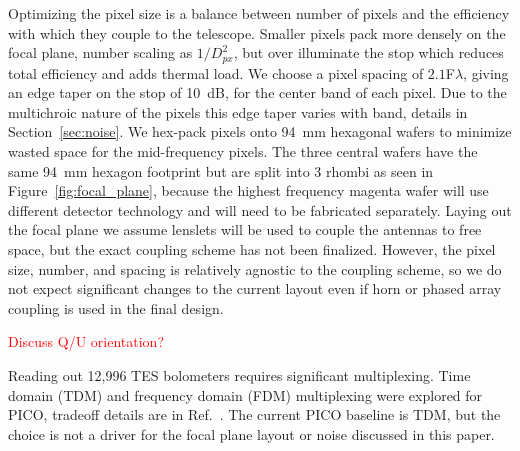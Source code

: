 \documentclass[]{spie}  %
\newcommand{\comr}[1]{\textcolor{red}{#1}}
\newcommand{\dgr}{$^\circ$}
\begin{document}
Optimizing the pixel size is a balance between number of pixels and the efficiency with which they couple to the telescope. Smaller pixels pack more densely 
on the focal plane, number scaling as $1/D_{px}^2$, but over illuminate the stop which reduces total efficiency and adds thermal load.  
We choose a pixel spacing of $2.1$F$\lambda$, giving an edge taper on the stop of 10~dB, for the center 
band of each pixel. Due to the multichroic nature of the pixels this edge taper varies with band, details in Section~\ref{sec:noise}. We hex-pack pixels onto 
94~mm hexagonal wafers to minimize wasted space for the mid-frequency pixels. The three central wafers have the same 94~mm hexagon footprint but are split into 
3 rhombi as seen in Figure~\ref{fig:focal_plane}, because the highest frequency magenta wafer will use different detector technology and will need to be 
fabricated separately.  Laying out the focal plane we assume lenslets \cite{Suzuki2014_samps} will be used to couple the antennas to free space, 
but the exact coupling scheme has not been finalized.  
However, the pixel size, number, and spacing is relatively agnostic to the coupling scheme, so we do not expect significant changes to the 
current layout even if horn or phased array coupling is used in the final design.

\comr{Discuss Q/U orientation?}

Reading out 12,996 TES bolometers requires significant multiplexing.  Time domain (TDM) and frequency domain (FDM) 
multiplexing were explored for PICO, tradeoff details are in Ref.~.  The current PICO baseline is TDM, 
but the choice is not a driver for the focal plane layout or noise discussed in this paper.
\end{document}
